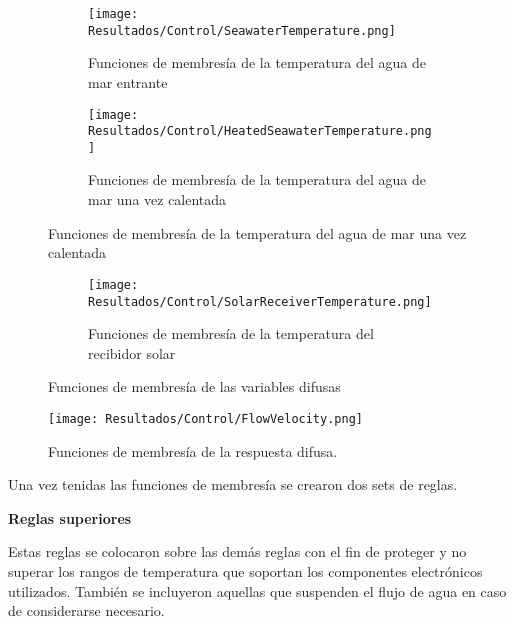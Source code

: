 			\begin{figure}[H]
				\centering
				\begin{subfigure}[t]{0.45\linewidth}
					\centering
					\texttt{[image: Resultados/Control/SeawaterTemperature.png]}
					\caption{Funciones de membresía de la temperatura del agua de mar entrante}
					\label{fig:SeawaterTemperature}
				\end{subfigure}
				\hfill
				\begin{subfigure}[t]{0.45\linewidth}
					\centering
					\texttt{[image: Resultados/Control/HeatedSeawaterTemperature.png]}
					\caption{Funciones de membresía de la temperatura del agua de mar una vez calentada}
					\label{fig:HeatedSeawaterTemperature}
				\end{subfigure}
			\end{figure}
			
			\begin{figure}[H]\ContinuedFloat
				\begin{subfigure}[t]{0.45\linewidth}
					\centering
					\texttt{[image: Resultados/Control/SolarReceiverTemperature.png]}
					\caption{Funciones de membresía de la temperatura del recibidor solar}
					\label{fig:SolarReceiverTemperature}
				\end{subfigure}
				\hfill
				\caption{Funciones de membresía de las variables difusas}
				\label{fig:var-membership-functions}
			\end{figure}
			
			\begin{figure}[H]
				\centering
				\texttt{[image: Resultados/Control/FlowVelocity.png]}
				\caption{Funciones de membresía de la respuesta difusa.}
				\label{fig:FlowVelocity}
			\end{figure}
			
			Una vez tenidas las funciones de membresía se crearon dos sets de reglas.
			
			\textbf{Reglas superiores}\par
			
			Estas reglas se colocaron sobre las demás reglas con el fin de proteger y no superar los rangos de temperatura que soportan los componentes electrónicos utilizados. También se incluyeron aquellas que suspenden el flujo de agua en caso de considerarse necesario.
			
